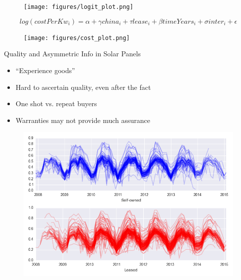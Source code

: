 \documentclass{beamer}
\begin{document}
\begin{frame}[plain]
	\begin{figure}
		\texttt{[image: figures/logit\_plot.png]}
	\end{figure}	
\end{frame}



\begin{frame}[plain]
	\begin{equation}
		log(costPerKw_i) = \alpha + \gamma china_i + \tau lease_i + \beta timeYears_i + \sigma inter_i + \epsilon
	\end{equation}	
\end{frame}



\begin{frame}[plain]
	\begin{figure}
		\texttt{[image: figures/cost\_plot.png]}
	\end{figure}
\end{frame}

\begin{frame}
	Quality and Asymmetric Info in Solar Panels
	\begin{itemize}
	\item ``Experience goods''
	\item Hard to ascertain quality, even after the fact
	\item One shot vs. repeat buyers
	\item Warranties may not provide much assurance
	\end{itemize}	
\end{frame}

\begin{frame}
	\begin{figure}
		\includegraphics[width=1\textwidth]{tot_production.png}
	\end{figure}
\end{frame}
\end{document}
